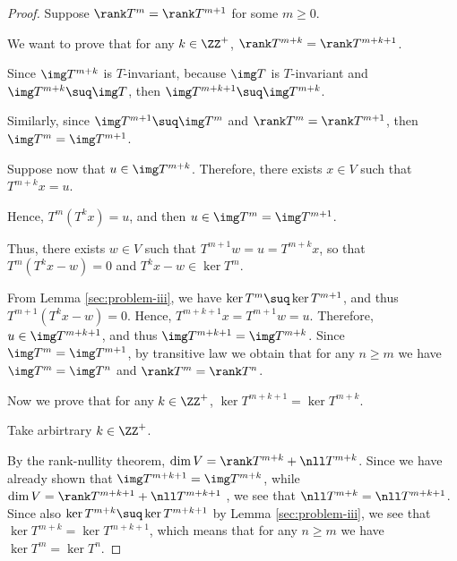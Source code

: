 \documentclass[11pt]{scrartcl}
\begin{document}
\begin{proof}
  \hfill

  Suppose $\rank T^m = \rank T^{m+1}$ for some $m\geq 0$.
  

  We want to prove that for any $k\in\ZZ^+$,
  $\rank T^{m+k} = \rank T^{m+k+1}$.

  Since $\img T^{m+k}$ is $T$-invariant, because $\img T$ is
  $T$-invariant and $\img T^{m+k}\suq \img T$, then
  $\img T^{m+k+1}\suq \img T^{m+k}$.

  Similarly, since $\img T^{m+1}\suq \img T^m$ and
  $\rank T^m = \rank T^{m+1}$, then $\img T^m = \img T^{m+1}$.

  Suppose now that $u \in \img T^{m+k}$. Therefore, there exists
  $x\in V$ such that $T^{m+k}x = u$.

  Hence, $T^m(T^kx) = u$, and then $u \in \img T^m=\img T^{m+1}$.

  Thus, there exists $w\in V$ such that $T^{m+1}w = u = T^{m+k}x$, so
  that $T^m(T^kx-w) = 0$ and $T^kx-w \in \ker T^m$.

  From Lemma \ref{sec:problem-iii}, we have
  $\ker T^m\suq \ker T^{m+1}$, and thus $T^{m+1}(T^kx-w) = 0$. Hence,
  $T^{m+k+1}x=T^{m+1}w = u$. Therefore, $u\in \img T^{m+k+1}$, and
  thus $\img T^{m+k+1}=\img T^{m+k}$. Since $\img T^m=\img T^{m+1}$,
  by transitive law we obtain that for any $n\geq m$ we have
  $\img T^m = \img T^n$ and $\rank T^m = \rank T^n$.








  Now we prove that for any $k\in\ZZ^+$, $\ker T^{m+k+1} = \ker T^{m+k}$.

  Take arbirtrary $k\in \ZZ^+$.

  By the rank-nullity theorem, $\dim V = \rank T^{m+k}+\nll
  T^{m+k}$. Since we have already shown that
  $\img T^{m+k+1} = \img T^{m+k}$, while
  $\dim V = \rank T^{m+k+1} +\nll T^{m+k+1}$ , we see that
  $\nll T^{m+k} = \nll T^{m+k+1}$. Since also
  $\ker T^{m+k}\suq \ker T^{m+k+1}$ by Lemma \ref{sec:problem-iii}, we
  see that $\ker T^{m+k} = \ker T^{m+k+1}$, which means that for any
  $n\geq m$ we have $\ker T^m =\ker T^{n}$.
\end{proof}
\end{document}
